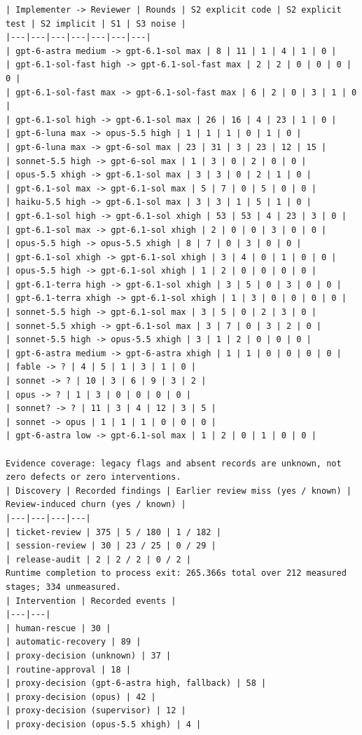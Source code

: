 \documentclass[11pt,a4paper]{article}
\begin{document}
{\begin{verbatim}
| Implementer -> Reviewer | Rounds | S2 explicit code | S2 explicit test | S2 implicit | S1 | S3 noise |
|---|---|---|---|---|---|---|
| gpt-6-astra medium -> gpt-6.1-sol max | 8 | 11 | 1 | 4 | 1 | 0 |
| gpt-6.1-sol-fast high -> gpt-6.1-sol-fast max | 2 | 2 | 0 | 0 | 0 | 0 |
| gpt-6.1-sol-fast max -> gpt-6.1-sol-fast max | 6 | 2 | 0 | 3 | 1 | 0 |
| gpt-6.1-sol high -> gpt-6.1-sol max | 26 | 16 | 4 | 23 | 1 | 0 |
| gpt-6-luna max -> opus-5.5 high | 1 | 1 | 1 | 0 | 1 | 0 |
| gpt-6-luna max -> gpt-6-sol max | 23 | 31 | 3 | 23 | 12 | 15 |
| sonnet-5.5 high -> gpt-6-sol max | 1 | 3 | 0 | 2 | 0 | 0 |
| opus-5.5 xhigh -> gpt-6.1-sol max | 3 | 3 | 0 | 2 | 1 | 0 |
| gpt-6.1-sol max -> gpt-6.1-sol max | 5 | 7 | 0 | 5 | 0 | 0 |
| haiku-5.5 high -> gpt-6.1-sol max | 3 | 3 | 1 | 5 | 1 | 0 |
| gpt-6.1-sol high -> gpt-6.1-sol xhigh | 53 | 53 | 4 | 23 | 3 | 0 |
| gpt-6.1-sol max -> gpt-6.1-sol xhigh | 2 | 0 | 0 | 3 | 0 | 0 |
| opus-5.5 high -> opus-5.5 xhigh | 8 | 7 | 0 | 3 | 0 | 0 |
| gpt-6.1-sol xhigh -> gpt-6.1-sol xhigh | 3 | 4 | 0 | 1 | 0 | 0 |
| opus-5.5 high -> gpt-6.1-sol xhigh | 1 | 2 | 0 | 0 | 0 | 0 |
| gpt-6.1-terra high -> gpt-6.1-sol xhigh | 3 | 5 | 0 | 3 | 0 | 0 |
| gpt-6.1-terra xhigh -> gpt-6.1-sol xhigh | 1 | 3 | 0 | 0 | 0 | 0 |
| sonnet-5.5 high -> gpt-6.1-sol max | 3 | 5 | 0 | 2 | 3 | 0 |
| sonnet-5.5 xhigh -> gpt-6.1-sol max | 3 | 7 | 0 | 3 | 2 | 0 |
| sonnet-5.5 high -> opus-5.5 xhigh | 3 | 1 | 2 | 0 | 0 | 0 |
| gpt-6-astra medium -> gpt-6-astra xhigh | 1 | 1 | 0 | 0 | 0 | 0 |
| fable -> ? | 4 | 5 | 1 | 3 | 1 | 0 |
| sonnet -> ? | 10 | 3 | 6 | 9 | 3 | 2 |
| opus -> ? | 1 | 3 | 0 | 0 | 0 | 0 |
| sonnet? -> ? | 11 | 3 | 4 | 12 | 3 | 5 |
| sonnet -> opus | 1 | 1 | 1 | 0 | 0 | 0 |
| gpt-6-astra low -> gpt-6.1-sol max | 1 | 2 | 0 | 1 | 0 | 0 |

Evidence coverage: legacy flags and absent records are unknown, not zero defects or zero interventions.
| Discovery | Recorded findings | Earlier review miss (yes / known) | Review-induced churn (yes / known) |
|---|---|---|---|
| ticket-review | 375 | 5 / 180 | 1 / 182 |
| session-review | 30 | 23 / 25 | 0 / 29 |
| release-audit | 2 | 2 / 2 | 0 / 2 |
Runtime completion to process exit: 265.366s total over 212 measured stages; 334 unmeasured.
| Intervention | Recorded events |
|---|---|
| human-rescue | 30 |
| automatic-recovery | 89 |
| proxy-decision (unknown) | 37 |
| routine-approval | 18 |
| proxy-decision (gpt-6-astra high, fallback) | 58 |
| proxy-decision (opus) | 42 |
| proxy-decision (supervisor) | 12 |
| proxy-decision (opus-5.5 xhigh) | 4 |
\end{verbatim}
}
\end{document}
